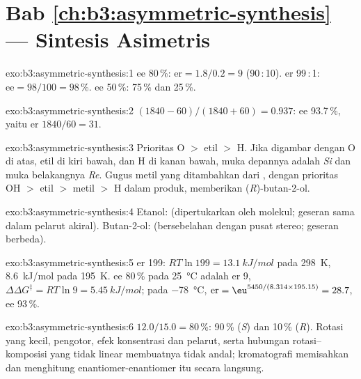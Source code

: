 \section*{Bab \ref{ch:b3:asymmetric-synthesis} --- Sintesis Asimetris}

\begin{solution}{exo:b3:asymmetric-synthesis:1}
ee 80\,\%: $\mathrm{er} = 1.8/0.2 = 9$ (90\,:\,10). er 99\,:\,1: $\mathrm{ee} = 98/100 = 98$\,\%. ee 50\,\%: 75\,\% dan 25\,\%.
\end{solution}

\begin{solution}{exo:b3:asymmetric-synthesis:2}
$(1840 - 60)/(1840 + 60) = 0.937$: ee 93.7\,\%, yaitu er $1840/60 = 31$.
\end{solution}

\begin{solution}{exo:b3:asymmetric-synthesis:3}
Prioritas O $>$ etil $>$ H. Jika digambar dengan O di atas, etil di kiri bawah, dan H di kanan bawah,
muka depannya adalah \textit{Si} dan muka belakangnya \textit{Re}. Gugus metil yang ditambahkan dari , dengan
prioritas OH $>$ etil $>$ metil $>$ H dalam produk, memberikan (\textit{R})-butan-2-ol.
\end{solution}

\begin{solution}{exo:b3:asymmetric-synthesis:4}
Etanol:  (dipertukarkan oleh  molekul; geseran
sama dalam pelarut akiral). Butan-2-ol:  (bersebelahan dengan pusat stereo;
geseran berbeda).
\end{solution}

\begin{solution}{exo:b3:asymmetric-synthesis:5}
er 199: $RT\ln 199 = \qty{13.1}{kJ/mol}$ pada \qty{298}{K}, \qty{8.6}{kJ/mol} pada \qty{195}{K}. ee 80\,\% pada \qty{25}{\celsius} adalah er 9,
$\Delta\Delta G^\ddagger = RT\ln 9 = \qty{5.45}{kJ/mol}$; pada \qty{-78}{\celsius}, $\mathrm{er} = \eu^{5450/(8.314 \times 195.15)} = 28.7$, ee 93\,\%.
\end{solution}

\begin{solution}{exo:b3:asymmetric-synthesis:6}
 $12.0/15.0 = 80$\,\%: 90\,\% (\textit{S}) dan 10\,\% (\textit{R}). Rotasi yang kecil, pengotor,
efek konsentrasi dan pelarut, serta hubungan rotasi--komposisi yang tidak linear
membuatnya tidak andal; kromatografi memisahkan dan menghitung
enantiomer-enantiomer itu secara langsung.
\end{solution}

